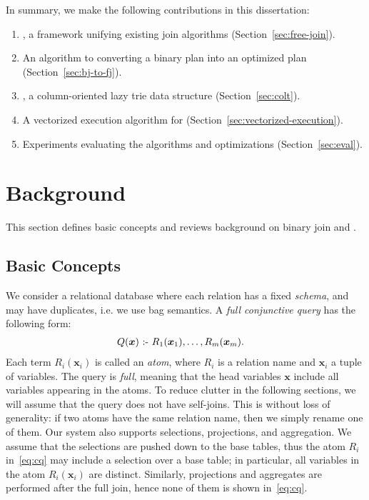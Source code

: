   
In summary, we make the following contributions in this dissertation:
\begin{enumerate}
  \item \FJ, a framework unifying existing join algorithms (Section~\ref{sec:free-join}).
  \item An algorithm to converting a binary plan into an
    optimized \FJ plan (Section~\ref{sec:bj-to-fj}).
  \item \COLT, a column-oriented lazy trie data structure (Section~\ref{sec:colt}).
  \item A vectorized execution algorithm for \FJ (Section~\ref{sec:vectorized-execution}).
  \item Experiments evaluating the algorithms and optimizations (Section~\ref{sec:eval}).
\end{enumerate}

\section{Background}\label{sec:background:fj}

This section defines basic concepts and reviews background on binary
join and \GJ.

\subsection{Basic Concepts}\label{sec:basic-concepts}

We consider a relational database where each relation has a fixed
\emph{schema}, and may have duplicates, i.e. we use bag semantics.
A \emph{full conjunctive query} has the following form:
%
\begin{align}
  Q(\bm x) \text{ :- } & R_1(\bm x_1), \ldots, R_m(\bm x_m). \label{eq:cq}
\end{align}
%
Each term $R_i(\bm x_i)$ is called an \emph{atom}, where $R_i$ is a
relation name and $\bm x_i$ a tuple of variables.  The query is
\emph{full}, meaning that the head variables $\bm x$ include all
variables appearing in the atoms.  To reduce clutter in the following
sections, we will assume that the query does not have self-joins.
This is without loss of generality: if two atoms have the same
relation name, then we simply rename one of them.  Our system also
supports selections, projections, and aggregation.  We assume that the
selections are pushed down to the base tables, thus the atom $R_i$
in~\eqref{eq:cq} may include a selection over a base table; in
particular, all variables in the atom $R_i(\bm x_i)$ are distinct.
Similarly, projections and aggregates are performed after the full
join, hence none of them is shown in~\eqref{eq:cq}.


